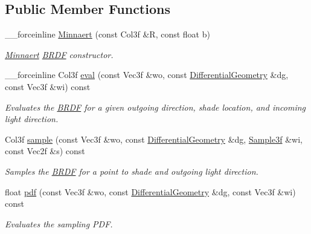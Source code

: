 \subsection*{Public Member Functions}
\begin{DoxyCompactItemize}
\item 
\_\-\_\-forceinline \hyperlink{classembree_1_1_minnaert_af1b00c4a76b0861b47a3e59787cc3054}{Minnaert} (const Col3f \&R, const float b)
\begin{DoxyCompactList}\small\item\em \hyperlink{classembree_1_1_minnaert}{Minnaert} \hyperlink{classembree_1_1_b_r_d_f}{BRDF} constructor. \item\end{DoxyCompactList}\item 
\_\-\_\-forceinline Col3f \hyperlink{classembree_1_1_minnaert_a9c297817db021bff59b90fd44a22ae0f}{eval} (const Vec3f \&wo, const \hyperlink{structembree_1_1_differential_geometry}{DifferentialGeometry} \&dg, const Vec3f \&wi) const 
\begin{DoxyCompactList}\small\item\em Evaluates the \hyperlink{classembree_1_1_b_r_d_f}{BRDF} for a given outgoing direction, shade location, and incoming light direction. \item\end{DoxyCompactList}\item 
Col3f \hyperlink{classembree_1_1_minnaert_af68ead9a773b6f55b21dad888870a10d}{sample} (const Vec3f \&wo, const \hyperlink{structembree_1_1_differential_geometry}{DifferentialGeometry} \&dg, \hyperlink{structembree_1_1_sample}{Sample3f} \&wi, const Vec2f \&s) const 
\begin{DoxyCompactList}\small\item\em Samples the \hyperlink{classembree_1_1_b_r_d_f}{BRDF} for a point to shade and outgoing light direction. \item\end{DoxyCompactList}\item 
float \hyperlink{classembree_1_1_minnaert_a52cdcd2bc7700f4aeb61de5e1c980823}{pdf} (const Vec3f \&wo, const \hyperlink{structembree_1_1_differential_geometry}{DifferentialGeometry} \&dg, const Vec3f \&wi) const 
\begin{DoxyCompactList}\small\item\em Evaluates the sampling PDF. \item\end{DoxyCompactList}\end{DoxyCompactItemize}



